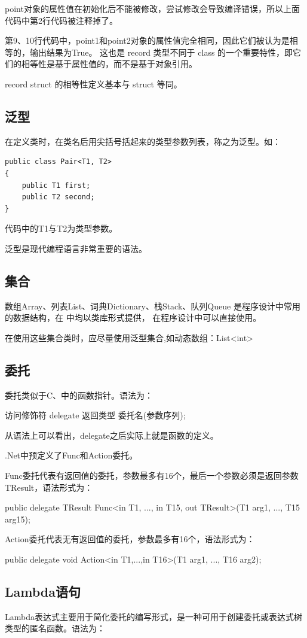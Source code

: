 point对象的属性值在初始化后不能被修改，尝试修改会导致编译错误，所以上面代码中第2行代码被注释掉了。

第9、10行代码中，point1和point2对象的属性值完全相同，因此它们被认为是相等的，输出结果为True。
这也是 record 类型不同于 class 的一个重要特性，即它们的相等性是基于属性值的，而不是基于对象引用。

record struct 的相等性定义基本与 struct 等同。

\subsection{泛型}
在定义类时，在类名后用尖括号括起来的类型参数列表，称之为泛型。如：
\begin{lstlisting}
public class Pair<T1, T2>
{
    public T1 first;
    public T2 second;
}
\end{lstlisting}
代码中的T1与T2为类型参数。

泛型是现代编程语言非常重要的语法。

\subsection{集合}
数组Array、列表List、词典Dictionary、栈Stack、队列Queue
是程序设计中常用的数据结构，在 \cs 中均以类库形式提供，
在\cs 程序设计中可以直接使用。

在使用这些集合类时，应尽量使用泛型集合,如动态数组：List<int>

\subsection{委托}
委托类似于C、\cpp 中的函数指针。语法为：

访问修饰符 delegate 返回类型 委托名(参数序列);

从语法上可以看出，delegate之后实际上就是函数的定义。

.Net中预定义了Func和Action委托。

Func委托代表有返回值的委托，参数最多有16个，最后一个参数必须是返回参数TResult，语法形式为：

public delegate TResult Func<in T1, ..., in T15, out TResult>(T1 arg1, ..., T15 arg15);

Action委托代表无有返回值的委托，参数最多有16个，语法形式为：

public delegate void Action<in T1,...,in T16>(T1 arg1, ..., T16 arg2);

\subsection{Lambda语句}
Lambda表达式主要用于简化委托的编写形式，是一种可用于创建委托或表达式树类型的匿名函数。语法为：

